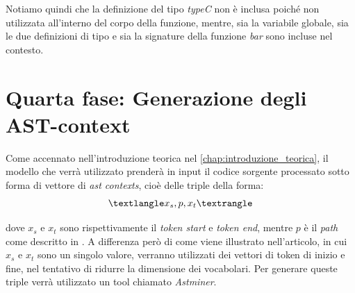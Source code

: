 Notiamo quindi che la definizione del tipo \textit{typeC} non è inclusa poiché non utilizzata all'interno del corpo della funzione, mentre, sia la variabile globale, sia le due definizioni di tipo e sia la signature della funzione \textit{bar} sono incluse nel contesto.


\section{Quarta fase: Generazione degli AST-context}
Come accennato nell'introduzione teorica nel \autoref{chap:introduzione_teorica}, il modello che verrà utilizzato prenderà in input il codice sorgente processato sotto forma di vettore di \textit{ast contexts}, cioè delle triple della forma:
  \[\anglebra{x_s, p, x_t}\]

dove $x_s$ e $x_t$ sono rispettivamente il \textit{token start} e \textit{token end}, mentre $p$ è il \textit{path} come descritto in \cite{alon2019code2vec}.
A differenza però di come viene illustrato nell'articolo, in cui $x_s$ e $x_t$ sono un singolo valore, verranno utilizzati dei vettori di token di inizio e fine, nel tentativo di ridurre la dimensione dei vocabolari.
Per generare queste triple verrà utilizzato un tool chiamato \textit{Astminer}.

